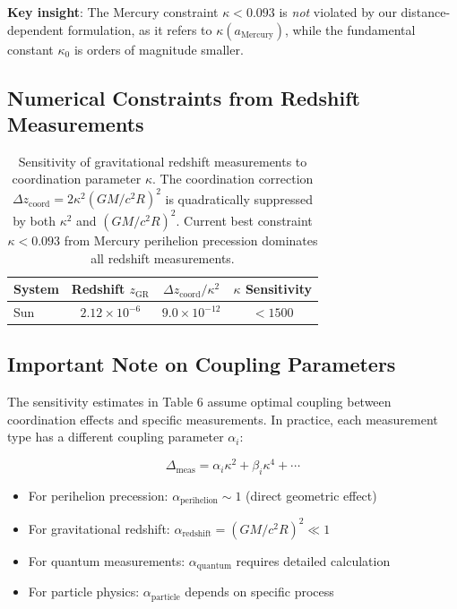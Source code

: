 \documentclass[11pt,a4paper]{article}
\begin{document}
\textbf{Key insight}: The Mercury constraint $\kappa < 0.093$ is \textit{not} violated 
by our distance-dependent formulation, as it refers to $\kappa(a_{\text{Mercury}})$, 
while the fundamental constant $\kappa_0$ is orders of magnitude smaller.
\subsection{Numerical Constraints from Redshift Measurements}

\begin{table}[htbp]
	\centering
\begin{tabular}{lccc}
	\toprule
	\textbf{System} & \textbf{Redshift $z_{\text{GR}}$} & \textbf{$\Delta z_{\text{coord}}/\kappa^2$} & \textbf{$\kappa$ Sensitivity} \\
	\midrule
	Sun & $2.12\times10^{-6}$ & $9.0\times10^{-12}$ & $<1500$ \\
\end{tabular}
	\caption{Sensitivity of gravitational redshift measurements to coordination parameter $\kappa$. 
		The coordination correction $\Delta z_{\text{coord}} = 2\kappa^2 (GM/c^2R)^2$ is quadratically suppressed 
		by both $\kappa^2$ and $(GM/c^2R)^2$. Current best constraint $\kappa < 0.093$ from 
		Mercury perihelion precession dominates all redshift measurements.}
\end{table}
	\subsection{Important Note on Coupling Parameters}
	
	The sensitivity estimates in Table 6 assume optimal coupling between coordination effects and specific measurements. In practice, each measurement type has a different coupling parameter $\alpha_i$:
	
	\begin{equation}
		\Delta_{\text{meas}} = \alpha_i \kappa^2 + \beta_i \kappa^4 + \cdots
	\end{equation}
	
	\begin{itemize}
		\item For perihelion precession: $\alpha_{\text{perihelion}} \sim 1$ (direct geometric effect)
		\item For gravitational redshift: $\alpha_{\text{redshift}} = (GM/c^2R)^2 \ll 1$
		\item For quantum measurements: $\alpha_{\text{quantum}}$ requires detailed calculation
		\item For particle physics: $\alpha_{\text{particle}}$ depends on specific process
	\end{itemize}
	
\end{document}
